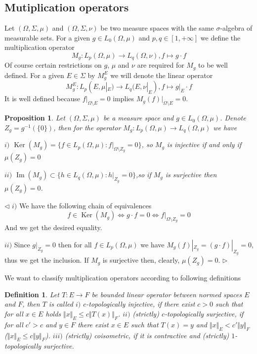 \documentclass[12pt]{article}
\newtheorem{proposition}[theorem]{Proposition}
\newtheorem{definition}[theorem]{Definition}
\newenvironment{proof}{\par $\triangleleft$}{$\triangleright$}
\begin{document}
\subsection{Mutiplication operators}

Let $(\Omega,\Sigma,\mu)$ and $(\Omega,\Sigma,\nu)$ be two measure spaces with the same $\sigma$-algebra of measurable sets. For a given $g\in L_0(\Omega,\mu)$ and $p,q\in[1,+\infty]$ we define the multiplication operator
$$
M_g:L_p(\Omega,\mu)\to L_q(\Omega,\nu), f\mapsto g\cdot f
$$
Of course certain restrictions on $g$, $\mu$ and $\nu$ are required for $M_g$ to be well defined. For a given $E\in\Sigma$ by $M_g^E$ we will denote the linear operator
$$
M_g^E:L_p(E,\mu|_E)\to L_q(E,\nu|_E),f\mapsto g|_E\cdot f
$$
It is well defined because $f|_{\Omega\setminus E}=0$ implies $M_g(f)|_{\Omega\setminus E}=0$.

\begin{proposition}\label{MultpOpSurjInjDesc} Let $(\Omega,\Sigma,\mu)$ be a measure space and $g\in L_0(\Omega,\mu)$. Denote $Z_g=g^{-1}(\{0\})$, then for the operator $M_g:L_p(\Omega,\mu)\to L_q(\Omega,\mu)$ we have

$i)$ $\operatorname{Ker}(M_g)=\{f\in L_p(\Omega,\mu):f|_{\Omega\setminus {Z_g}}=0\}$, so $M_g$ is injective if and only if $\mu(Z_g)=0$

$ii)$ $\operatorname{Im}(M_g)\subset\{h\in L_q(\Omega,\mu): h|_{Z_g}=0\}$,so if $M_g$ is surjective then $\mu(Z_g)=0$.

\end{proposition}
\begin{proof}
$i)$ We have the following chain of equivalences
$$
f\in\operatorname{Ker}(M_g)
\Longleftrightarrow g\cdot f=0
\Longleftrightarrow f|_{\Omega\setminus Z_g}=0
$$
And we get the desired equality.

$ii)$ Since $g|_{Z_g}=0$ then for all $f\in L_p(\Omega,\mu)$ we have $M_g(f)|_{Z_g}=(g\cdot f)|_{Z_g}=0$, thus we get the inclusion. If $M_g$ is surjective then, clearly,  $\mu(Z_g)=0$.
\end{proof}
\newline

We want to classify multiplication operators according to following definitions

\begin{definition}\label{DefNorOpType} Let $ T:E\to F$ be bounded linear operator between normed spaces $E$ and $F$, then $ T$ is called
\newline
$i)$ \textit{$c$-topologically injective}, if there exist $c > 0$ such that for all $x \in E$ holds $\Vert x\Vert_E\leq c\Vert  T(x)\Vert_F$.
\newline
$ii)$ \textit{(strictly) $c$-topologically surjective}, if for all $c'>c$ and  $y\in F$ there exist $x \in E$ such that $ T(x) = y$ and $\Vert x \Vert_E < c' \Vert y \Vert_F$ ($\Vert x \Vert_E \leq c \Vert y \Vert_F$).
\newline
$iii)$ (strictly) coisometric, if it is contractive and (strictly) $1$-topologically surjective.
\end{definition}
\end{document}
